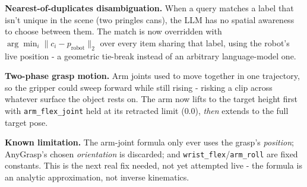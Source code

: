 \documentclass[11pt]{article}
\begin{document}
\textbf{Nearest-of-duplicates disambiguation.} When a query matches a label that
isn't unique in the scene (two pringles cans), the LLM has no spatial awareness to
choose between them. The match is now overridden with
$\arg\min_i \lVert c_i - p_{\text{robot}}\rVert_2$ over every item sharing that label,
using the robot's live position - a geometric tie-break instead of an arbitrary
language-model one.

\textbf{Two-phase grasp motion.} Arm joints used to move together in one trajectory,
so the gripper could sweep forward while still rising - risking a clip across
whatever surface the object rests on. The arm now lifts to the target height first
with \texttt{arm\_flex\_joint} held at its retracted limit ($0.0$), \emph{then}
extends to the full target pose.

\textbf{Known limitation.} The arm-joint formula only ever uses the grasp's
\emph{position}; AnyGrasp's chosen \emph{orientation} is discarded; and
\texttt{wrist\_flex}/\texttt{arm\_roll} are fixed constants. This is the next real
fix needed, not yet attempted live - the formula is an analytic approximation, not
inverse kinematics.
\end{document}

